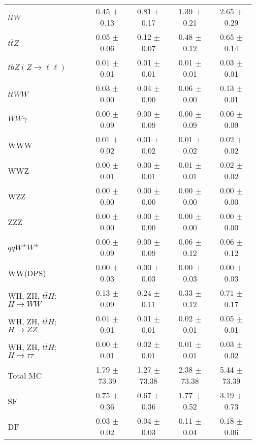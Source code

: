 \begin{tabular}{l|cccc}
                   $t\overline{t}W$ &  0.45 $\pm$  0.13 &  0.81 $\pm$  0.17 &  1.39 $\pm$  0.21 &  2.65 $\pm$  0.29 \\
                   $t\overline{t}Z$ &  0.05 $\pm$  0.06 &  0.12 $\pm$  0.07 &  0.48 $\pm$  0.12 &  0.65 $\pm$  0.14 \\
    $tbZ (Z \rightarrow \ell \ell)$ &  0.01 $\pm$  0.01 &  0.01 $\pm$  0.01 &  0.01 $\pm$  0.01 &  0.03 $\pm$  0.01 \\
                  $t\overline{t}WW$ &  0.03 $\pm$  0.00 &  0.04 $\pm$  0.00 &  0.06 $\pm$  0.00 &  0.13 $\pm$  0.01 \\
                         $WW\gamma$ &  0.00 $\pm$  0.09 &  0.00 $\pm$  0.09 &  0.00 $\pm$  0.09 &  0.00 $\pm$  0.09 \\
                                WWW &  0.01 $\pm$  0.02 &  0.01 $\pm$  0.02 &  0.01 $\pm$  0.02 &  0.02 $\pm$  0.02 \\
                                WWZ &  0.00 $\pm$  0.01 &  0.00 $\pm$  0.01 &  0.01 $\pm$  0.01 &  0.02 $\pm$  0.02 \\
                                WZZ &  0.00 $\pm$  0.00 &  0.00 $\pm$  0.00 &  0.00 $\pm$  0.00 &  0.00 $\pm$  0.00 \\
                                ZZZ &  0.00 $\pm$  0.00 &  0.00 $\pm$  0.00 &  0.00 $\pm$  0.00 &  0.00 $\pm$  0.00 \\
                 $qqW^{\pm}W^{\pm}$ &  0.00 $\pm$  0.09 &  0.00 $\pm$  0.09 &  0.06 $\pm$  0.12 &  0.06 $\pm$  0.12 \\
                            WW(DPS) &  0.00 $\pm$  0.03 &  0.00 $\pm$  0.03 &  0.00 $\pm$  0.03 &  0.00 $\pm$  0.03 \\
WH, ZH, $t\bar{t}H$; $H \rightarrow WW$ &  0.13 $\pm$  0.09 &  0.24 $\pm$  0.11 &  0.33 $\pm$  0.12 &  0.71 $\pm$  0.17 \\
WH, ZH, $t\bar{t}H$; $H \rightarrow ZZ$ &  0.01 $\pm$  0.01 &  0.01 $\pm$  0.01 &  0.02 $\pm$  0.01 &  0.05 $\pm$  0.01 \\
WH, ZH, $t\bar{t}H$; $H \rightarrow \tau\tau$ &  0.00 $\pm$  0.01 &  0.02 $\pm$  0.01 &  0.01 $\pm$  0.01 &  0.03 $\pm$  0.02 \\
\hline\hline
                           Total MC &  1.79 $\pm$ 73.39 &  1.27 $\pm$ 73.38 &  2.38 $\pm$ 73.38 &  5.44 $\pm$ 73.39 \\
\hline
                                 SF &  0.75 $\pm$  0.36 &  0.67 $\pm$  0.36 &  1.77 $\pm$  0.52 &  3.19 $\pm$  0.73 \\
                                 DF &  0.03 $\pm$  0.02 &  0.04 $\pm$  0.03 &  0.11 $\pm$  0.04 &  0.18 $\pm$  0.06 \\

\end{tabular}
